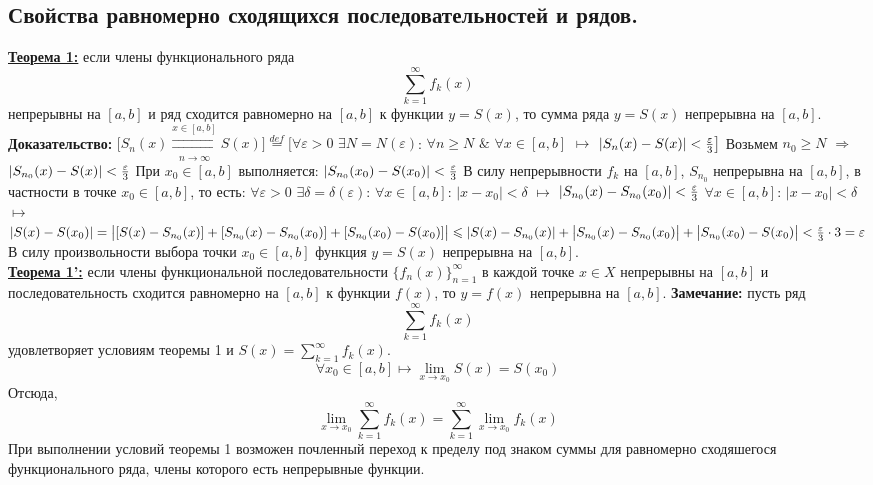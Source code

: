 \documentclass[a4paper,12pt]{article} %
\renewcommand {\geq}{\geqslant}
\renewcommand {\leq}{\leqslant}
\begin{document}
\subsection{Свойства равномерно сходящихся последовательностей и рядов.}
\underline{\textbf{Теорема 1:}} если члены функционального ряда $$\sum\limits_{k = 1}^{\infty}  f_k(x)$$   непрерывны на $[a,b]$ и ряд сходится равномерно на $[a,b]$ к функции $y = S(x)$, то сумма ряда 
$y = S(x)$ непрерывна на $[a,b]$. \\
\textbf{Доказательство:} \newline
$\big[S_n(x) \overset{x \in [a,b]}{\underset{n \rightarrow \infty}{\rightrightarrows}} S(x)\big]\stackrel{def}{=} \big[ \forall \varepsilon > 0 $  $\exists N = N(\varepsilon)$: $\forall n \geq N$  $\&$  $\forall x \in [a,b]$ $\longmapsto$ $|S_n(x) -S(x)| < {\varepsilon \over 3} \big]$
Возьмем $n_0 \geq N$ $\Rightarrow$ $|S_{n_0}(x)-S(x)| < {\varepsilon \over 3}$
При $x_0 \in [a,b]$ выполняется:
$|S_{n_0}(x_0)-S(x_0)| < {\varepsilon \over 3}$
В силу непрерывности $f_k$ на $[a,b]$, $S_{n_0}$ непрерывна на $[a,b]$, в частности в точке $x_0 \in [a,b]$, то есть:
$\forall \varepsilon > 0$ $\exists \delta = \delta(\varepsilon)$: $\forall x \in [a,b]$:  $|x-x_0|<\delta$ $\longmapsto$ $|S_{n_0}(x) - S_{n_0}(x_0)| < {\varepsilon \over 3}$
$\forall x \in [a,b]$: $|x-x_0|<\delta$ $\longmapsto$ 
\newline
$|S(x) - S(x_0)| = \big| [S(x)-S_{n_0}(x)] + [S_{n_0}(x)-S_{n_0}(x_0)] + [S_{n_0}(x_0)-S(x_0)]\big| \leq |S(x)-S_{n_0}(x)| + \big| S_{n_0}(x)-S_{n_0}(x_0)\big| + \big|S_{n_0}(x_0) - S(x_0)\big| < {\varepsilon \over 3} \cdot 3 = \varepsilon$
В силу произвольности выбора точки $x_0 \in [a,b]$ функция $y = S(x)$ непрерывна на $[a,b]$.\\
\underline{\textbf{Теорема 1':}} если члены функциональной последовательности $\{f_n(x)\}_{n=1}^\infty$ в каждой точке $x \in X$  непрерывны на $[a,b]$ и последовательность сходится равномерно на $[a,b]$ к функции $f(x)$, то $y = f(x)$ непрерывна на $[a,b]$. 
\textbf{Замечание:} пусть ряд $$\sum\limits_{k = 1}^{\infty}  f_k(x)$$ удовлетворяет условиям теоремы 1 и $S(x)=\sum\limits_{k = 1}^{\infty}  f_k(x)$.
$$\forall x_0 \in [a,b] \longmapsto \lim\limits_{x\rightarrow x_0} S(x) = S(x_0)$$
Отсюда, $$\lim\limits_{x\rightarrow x_0} \sum\limits_{k = 1}^{\infty}  f_k(x) = \sum\limits_{k = 1}^{\infty}  \lim\limits_{x\rightarrow x_0}f_k(x) $$
При выполнении условий теоремы 1 возможен почленный переход к пределу под знаком суммы для  равномерно сходяшегося функционального ряда, члены которого есть непрерывные функции.\\
\end{document}
